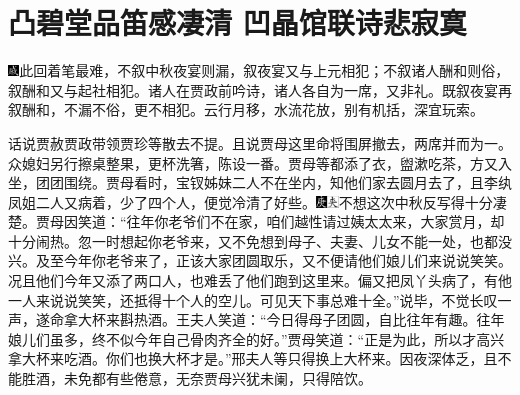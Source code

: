 \chapter{凸碧堂品笛感凄清 凹晶馆联诗悲寂寞}

{\includegraphics[width=3mm]{../Images/00005}\kaishu 此回着笔最难，不叙中秋夜宴则漏，叙夜宴又与上元相犯；不叙诸人酬和则俗，叙酬和又与起社相犯。诸人在贾政前吟诗，诸人各自为一席，又非礼。既叙夜宴再叙酬和，不漏不俗，更不相犯。云行月移，水流花放，别有机括，深宜玩索。}

话说贾赦贾政带领贾珍等散去不提。且说贾母这里命将围屏撤去，两席并而为一。众媳妇另行擦桌整果，更杯洗箸，陈设一番。贾母等都添了衣，盥漱吃茶，方又入坐，团团围绕。贾母看时，宝钗姊妹二人不在坐内，知他们家去圆月去了，且李纨凤姐二人又病着，少了四个人，便觉冷清了好些。{\includegraphics[width=3mm]{../Images/00004}\includegraphics[width=3mm]{../Images/00012}\footnotesize \kaishu 不想这次中秋反写得十分凄楚。}贾母因笑道：``往年你老爷们不在家，咱们越性请过姨太太来，大家赏月，却十分闹热。忽一时想起你老爷来，又不免想到母子、夫妻、儿女不能一处，也都没兴。及至今年你老爷来了，正该大家团圆取乐，又不便请他们娘儿们来说说笑笑。况且他们今年又添了两口人，也难丢了他们跑到这里来。偏又把凤丫头病了，有他一人来说说笑笑，还抵得十个人的空儿。可见天下事总难十全。''说毕，不觉长叹一声，遂命拿大杯来斟热酒。王夫人笑道：``今日得母子团圆，自比往年有趣。往年娘儿们虽多，终不似今年自己骨肉齐全的好。''贾母笑道：``正是为此，所以才高兴拿大杯来吃酒。你们也换大杯才是。''邢夫人等只得换上大杯来。因夜深体乏，且不能胜酒，未免都有些倦意，无奈贾母兴犹未阑，只得陪饮。

